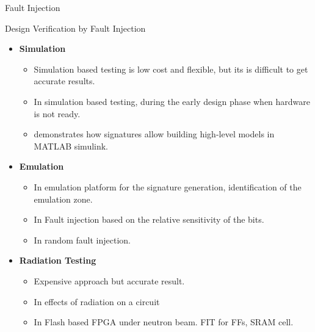 \documentclass[aspectratio=1610]{beamer}
\begin{document}
\begin{frame}{Fault Injection}


\vspace{-0.2cm}
\begin{block}{Design Verification by Fault Injection}
\end{block}


\begin{itemize}
\vspace{-0.25cm}
\item \textbf{Simulation}
\vspace{-0.11cm}
\begin{itemize}

\item Simulation based testing is low cost and flexible, but its is difficult to get accurate results.
\item In \citep{violante2004simulation} simulation based testing, during the early design phase when hardware is not ready.
\item \citep{robache2013methodology} demonstrates how signatures allow building high-level models in MATLAB simulink.
\end{itemize}


\item \textbf{Emulation}
\begin{itemize}
\item In \citep{hobeika2014multi} emulation platform for the signature generation, identification of the emulation zone.
\item In \citep{souari2016towards} Fault injection based on the relative sensitivity of the bits. 
\item In \citep{di2014fault} random fault injection.

\end{itemize}



\item \textbf{Radiation Testing}

\begin{itemize}
\item Expensive approach but accurate result.
\item In \citep{hobeika2014multi} effects of radiation on a circuit

\item In \citep{dsilva2015neutron} Flash based FPGA under neutron beam. FIT for FFs, SRAM cell.



\end{itemize}


\end{itemize}





\end{frame}
\end{document}
